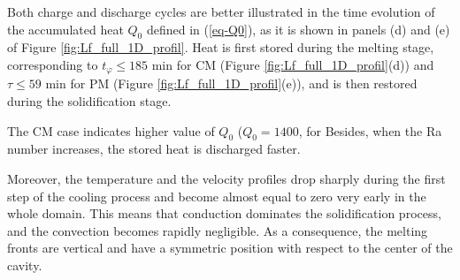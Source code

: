Both charge and  discharge cycles are better illustrated in the time evolution of the accumulated heat $Q_0$ defined in (\ref{eq-Q0}), as it is shown in panels (d) and (e) of Figure  \ref{fig:Lf_full_1D_profil}.
Heat is first stored during the melting stage, corresponding to $t_{\varphi} \leq 185$ min for CM (Figure \ref{fig:Lf_full_1D_profil}(d)) and $\tau \leq 59$ min for PM (Figure \ref{fig:Lf_full_1D_profil}(e)), and is then restored during the solidification stage.

\noindent The CM case indicates higher value of $Q_0$ ($Q_0 = 1400$, for  
Besides, when the Ra number increases, the stored heat is discharged faster.

\noindent Moreover, the temperature and the velocity profiles drop sharply during the first step of the cooling process and become almost equal to zero very early in the whole domain.
This means that conduction dominates the solidification process, and the convection becomes rapidly negligible.
As a consequence, the melting fronts are vertical and have a symmetric position with respect to the center of the cavity. \\

